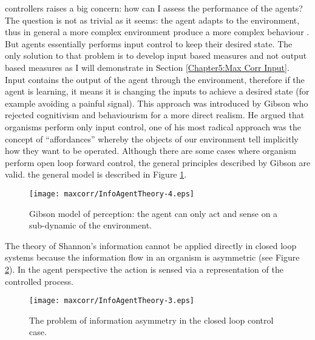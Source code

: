 controllers raises a big concern: how can I assess the performance of the agents?
The question is not as trivial as it seems: the agent adapts to the environment,
thus in general a more complex environment produce a more complex
behaviour \citep{NolfiInteraction}. 
But agents essentially performs input control to keep their desired state.
The only solution to that problem is to develop input based measures and not 
output based measures as I will demonstrate in Section \ref{Chapter5:Max Corr Input}.
Input contains the output of the agent through the environment,
therefore if the agent is learning, it means it is changing the inputs to achieve
a desired state (for example avoiding a painful signal).
This approach was introduced by Gibson \citep{Gibson1955:learning} who rejected
cognitivism and behaviourism for a more direct realism. 
He argued that organisms perform only input control, one of his most radical
 approach was the concept of ``affordances'' whereby the objects of our environment
 tell implicitly how they want to be operated.
Although there are some cases where organism perform open loop forward control,
 the general principles described by Gibson are valid.
the general model is described in Figure \ref{Figure:maxcorr:Gibson}.

\begin{figure}[ht]
  \begin{center}
    \texttt{[image: maxcorr/InfoAgentTheory-4.eps]}
    \caption[Gibson cybernetic approach]{
	     Gibson model of perception: the agent can only act and sense
	     on a sub-dynamic of the environment.
	     \label{Figure:maxcorr:Gibson}}
  \end{center}
\end{figure}

The theory of Shannon's information cannot be applied directly in closed loop
 systems because the information flow in an organism is asymmetric
(see Figure \ref{Figure:maxcorr:asymmetry}).
In the agent perspective the action is sensed via a representation of the
controlled process.

\begin{figure}[ht]
  \begin{center}
    \texttt{[image: maxcorr/InfoAgentTheory-3.eps]}
    \caption[Information asymmetry in the organism]{
	     The problem of information asymmetry in the closed loop control case.
	      \label{Figure:maxcorr:asymmetry}}
  \end{center}
\end{figure}

